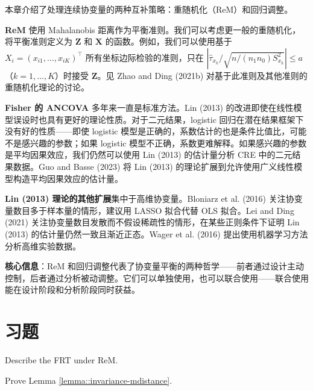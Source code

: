 本章介绍了处理连续协变量的两种互补策略：重随机化（ReM）和回归调整。

\textbf{ReM} 使用 Mahalanobis 距离作为平衡准则。我们可以考虑更一般的重随机化，将平衡准则定义为 $\mathbf{Z}$ 和 $\mathbf{X}$ 的函数。例如，我们可以使用基于 $X_i = (x_{i1}, \ldots, x_{iK})^\top$ 所有坐标边际检验的准则，只在 $|\hat{\tau}_{x_k} / \sqrt{n/(n_1 n_0) S_{x_k}^2}| \leq a$（$k = 1, \ldots, K$）时接受 $\mathbf{Z}$。见 Zhao and Ding (2021b) 对基于此准则及其他准则的重随机化理论的讨论。

\textbf{Fisher 的 ANCOVA} 多年来一直是标准方法。Lin (2013) 的改进即使在线性模型误设时也具有更好的理论性质。对于二元结果，logistic 回归在潜在结果框架下没有好的性质——即使 logistic 模型是正确的，系数估计的也是条件比值比，可能不是感兴趣的参数；如果 logistic 模型不正确，系数更难解释。如果感兴趣的参数是平均因果效应，我们仍然可以使用 Lin (2013) 的估计量分析 CRE 中的二元结果数据。Guo and Basse (2023) 将 Lin (2013) 的理论扩展到允许使用广义线性模型构造平均因果效应的估计量。

\textbf{Lin (2013) 理论的其他扩展}集中于高维协变量。Bloniarz et al. (2016) 关注协变量数目多于样本量的情形，建议用 LASSO 拟合代替 OLS 拟合。Lei and Ding (2021) 关注协变量数目发散而不假设稀疏性的情形，在某些正则条件下证明 Lin (2013) 的估计量仍然一致且渐近正态。Wager et al. (2016) 提出使用机器学习方法分析高维实验数据。

\textbf{核心信息}：ReM 和回归调整代表了协变量平衡的两种哲学——前者通过设计主动控制，后者通过分析被动调整。它们可以单独使用，也可以联合使用——联合使用能在设计阶段和分析阶段同时获益。

\section{习题}\label{sec:6-homework}

\begin{HomeworkProblem}\label{exr:6-1}

Describe the FRT under ReM.


\end{HomeworkProblem}

\begin{HomeworkProblem}\label{exr:6-2}

Prove Lemma \ref{lemma::invariance-mdistance}.


\end{HomeworkProblem}

